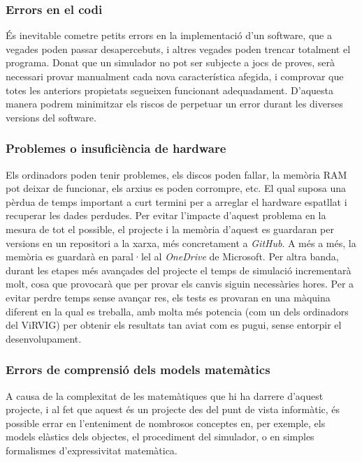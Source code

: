 \documentclass[a4paper]{report}
\begin{document}
	\subsubsection{Errors en el codi}
	És inevitable cometre petits errors en la implementació d'un software, que a vegades poden passar desapercebuts, i altres vegades poden trencar totalment el programa.\newline
	Donat que un simulador no pot ser subjecte a jocs de proves, serà necessari provar manualment cada nova característica afegida, i comprovar que totes les anteriors propietats segueixen funcionant adequadament. D'aquesta manera podrem minimitzar els riscos de perpetuar un error durant les diverses versions del software.
	\subsubsection{Problemes o insuficiència de hardware}
	Els ordinadors poden tenir problemes, els discos poden fallar, la memòria RAM pot deixar de funcionar, els arxius es poden corrompre, etc. El qual suposa una pèrdua de temps important a curt termini per a arreglar el hardware espatllat i recuperar les dades perdudes. \newline
	Per evitar l'impacte d'aquest problema en la mesura de tot el possible, el projecte i la memòria d'aquest es guardaran per versions en un repositori a la xarxa, més concretament a \textit{GitHub}. A més a més, la memòria es guardarà en paral·lel al \textit{OneDrive} de Microsoft.
	\newline
	Per altra banda, durant les etapes més avançades del projecte el temps de simulació incrementarà molt, cosa que provocarà que per provar els canvis siguin necessàries hores. \newline
	Per a evitar perdre temps sense avançar res, els tests es provaran en una màquina diferent en la qual es treballa, amb molta més potencia (com un dels ordinadors del ViRVIG) per obtenir els resultats tan aviat com es pugui, sense entorpir el desenvolupament.
	\subsubsection{Errors de comprensió dels models matemàtics}
	A causa de la complexitat de les matemàtiques que hi ha darrere d'aquest projecte, i al fet que aquest és un projecte des del punt de vista informàtic, és possible errar en l'enteniment de nombrosos conceptes en, per exemple, els models elàstics dels objectes, el procediment del simulador, o en simples formalismes d'expressivitat matemàtica. \newline
\end{document}
